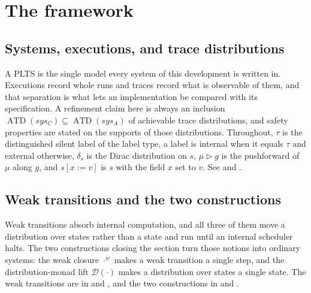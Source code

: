 
\chapter{The framework}

\section{Systems, executions, and trace distributions}

A PLTS is the single model every system of this development is written in.
Executions record whole runs and traces record what is observable of them, and that separation is what lets an implementation be compared with its specification.
A refinement claim here is always an inclusion $\operatorname{ATD}(sys_C) \subseteq \operatorname{ATD}(sys_A)$ of achievable trace distributions, and safety properties are stated on the supports of those distributions.
Throughout, $\tau$ is the distinguished silent label of the label type, a label is internal when it equals $\tau$ and external otherwise, $\delta_s$ is the Dirac distribution on $s$, $\mu \triangleright g$ is the pushforward of $\mu$ along $g$, and $s[x := v]$ is $s$ with the field $x$ set to $v$.
See  and .









\section{Weak transitions and the two constructions}

Weak transitions absorb internal computation, and all three of them move a distribution over states rather than a state and run until an internal scheduler halts.
The two constructions closing the section turn those notions into ordinary systems: the weak closure $\cdot^w$ makes a weak transition a single step, and the distribution-monad lift $\mathcal{D}(\cdot)$ makes a distribution over states a single state.
The weak transitions are in  and , and the two constructions in  and .

